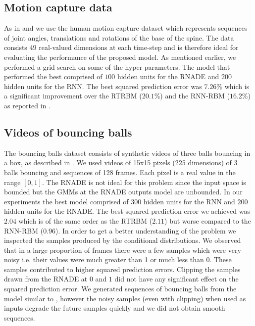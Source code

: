 \documentclass{article} %
\begin{document}
\subsection{Motion capture data}
As in \cite{Sutskever2008} and \cite{Boulanger-Lewandowski2012} we use the human motion capture dataset which represents sequences of joint angles, translations and rotations of the base of the spine. The data consists 49 real-valued dimensions at each time-step and is therefore ideal for evaluating the performance of the proposed model. As mentioned earlier, we performed a grid search on some of the hyper-parameters. The model that performed the best comprised of $100$ hidden units for the RNADE and $200$ hidden units for the RNN. The best squared prediction error was $\mathbf{7.26\%}$ which is a significant improvement over the RTRBM ($20.1\%$) and the RNN-RBM ($16.2\%$) as reported in \cite{Boulanger-Lewandowski2012}. 

\subsection{Videos of bouncing balls}
The bouncing balls dataset consists of synthetic videos of three balls bouncing in a box, as described in \cite{Sutskever2008}. We used videos of 15x15 pixels (225 dimensions) of 3 balls bouncing and sequences of 128 frames. Each pixel is a real value in the range $[0,1]$. The RNADE is not ideal for this problem since the input space is bounded but the GMMs at the RNADE outputs model are unbounded. In our experiments the best model comprised of $300$ hidden units for the RNN and $200$ hidden units for the RNADE. The best squared prediction error we achieved was $2.04$ which is of the same order as the RTRBM ($2.11$) but worse compared to the RNN-RBM ($0.96$). In order to get a better understanding of the problem we inspected the samples produced by the conditional distributions. We observed that in a large proportion of frames there were a few samples which were very noisy i.e. their values were much greater than 1 or much less than 0. These samples contributed to higher squared prediction errors. Clipping the samples drawn from the RNADE at $0$ and $1$ did not have any significant effect on the squared prediction error. We generated sequences of bouncing balls from the model similar to \cite{Sutskever2008}, however the noisy samples (even with clipping) when used as inputs degrade the future samples quickly and we did not obtain smooth sequences. 
\end{document}
